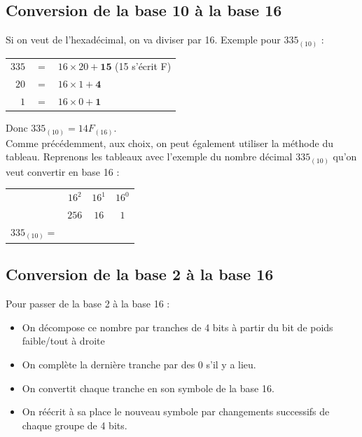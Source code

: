 \subsection{Conversion de la base 10 à la base 16}
Si on veut de l'hexadécimal, on va diviser par 16. Exemple pour $335_{(10)}$ :\\
\begin{center}
\begin{tabular}{rcl}
$335$ & $=$ & $16\times 20 + \mathbf{15}$ \quad (15 s'écrit F)\\
$20$ & $=$ & $16\times 1 + \mathbf{4}$\\
$1$ & $=$ & $16\times 0 + \mathbf{1}$\\
\end{tabular}
\end{center}
Donc $335_{(10)} = 14F_{(16)}$.\\

Comme précédemment, aux choix, on peut également utiliser la méthode du tableau. Reprenons les tableaux avec l'exemple du nombre décimal $335_{(10)}$ qu'on veut convertir en base 16 :
\begin{Avous}

\begin{center}
\begin{tabular}{lccc}
    & $16^2$ & $16^1$ & $16^0$\\
    & $256$ & $16$ & $1$\\
    \hline
    $335_{(10)} = $ &  &  & \\
    \end{tabular}
\end{center}
    \vspace{3cm}
    
\end{Avous}

\subsection{Conversion de la base 2 à la base 16}
Pour passer de la base 2 à la base 16 :
\begin{itemize}
    \item On décompose ce nombre par tranches de 4 bits à partir du bit de poids faible/tout à droite
    \item On complète la dernière tranche par des 0 s'il y a lieu.
    \item On convertit chaque tranche en son symbole de la base 16.
    \item On réécrit à sa place le nouveau symbole par changements successifs de chaque groupe de 4 bits.
\end{itemize}

